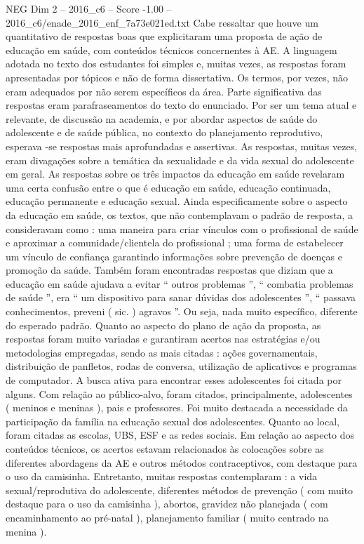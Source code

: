 \begin{textsample}{NEG Dim 2 – 2016\_c6 – Score -1.00 – 2016\_c6/enade\_2016\_enf\_7a73e021ed.txt}
Cabe ressaltar que houve um quantitativo de respostas boas que explicitaram uma proposta de ação de educação em saúde, com conteúdos técnicos concernentes à AE.
A linguagem adotada no texto dos estudantes foi simples e, muitas vezes, as respostas foram apresentadas por tópicos e não de forma dissertativa.
Os termos, por vezes, não eram adequados por não serem específicos da área.
Parte significativa das respostas eram parafraseamentos do texto do enunciado.
Por ser um tema atual e relevante, de discussão na academia, e por abordar aspectos de saúde do adolescente e de saúde pública, no contexto do planejamento reprodutivo, esperava -se respostas mais aprofundadas e assertivas.
As respostas, muitas vezes, eram divagações sobre a temática da sexualidade e da vida sexual do adolescente em geral.
As respostas sobre os três impactos da educação em saúde revelaram uma certa confusão entre o que é educação em saúde, educação continuada, educação permanente e educação sexual.
Ainda especificamente sobre o aspecto da educação em saúde, os textos, que não contemplavam o padrão de resposta, a consideravam como : uma maneira para criar vínculos com o profissional de saúde e aproximar a comunidade/clientela do profissional ; uma forma de estabelecer um vínculo de confiança garantindo informações sobre prevenção de doenças e promoção da saúde.
Também foram encontradas respostas que diziam que a educação em saúde ajudava a evitar “ outros problemas ”, “ combatia problemas de saúde ”, era “ um dispositivo para sanar dúvidas dos adolescentes ”, “ passava conhecimentos, preveni ( sic. ) agravos ”.
Ou seja, nada muito específico, diferente do esperado padrão.
Quanto ao aspecto do plano de ação da proposta, as respostas foram muito variadas e garantiram acertos nas estratégias e/ou metodologias empregadas, sendo as mais citadas : ações governamentais, distribuição de panfletos, rodas de conversa, utilização de aplicativos e programas de computador.
A busca ativa para encontrar esses adolescentes foi citada por alguns.
Com relação ao público-alvo, foram citados, principalmente, adolescentes ( meninos e meninas ), pais e professores.
Foi muito destacada a necessidade da participação da família na educação sexual dos adolescentes.
Quanto ao local, foram citadas as escolas, UBS, ESF e as redes sociais.
Em relação ao aspecto dos conteúdos técnicos, os acertos estavam relacionados às colocações sobre as diferentes abordagens da AE e outros métodos contraceptivos, com destaque para o uso da camisinha.
Entretanto, muitas respostas contemplaram : a vida sexual/reprodutiva do adolescente, diferentes métodos de prevenção ( com muito destaque para o uso da camisinha ), abortos, gravidez não planejada ( com encaminhamento ao pré-natal ), planejamento familiar ( muito centrado na menina ).

\end{textsample}
